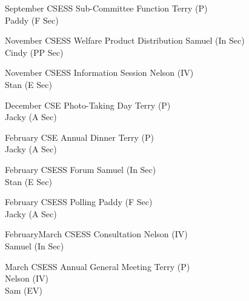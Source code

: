 {\bTR{}
\eTD\bTD September
\eTD{}
\eTD\bTD CSESS Sub-Committee Function
\eTD\bTD Terry (P) \\ Paddy (F Sec)
\eTD\eTR

\bTR{}
\eTD\bTD November
\eTD{}
\eTD\bTD CSESS Welfare Product Distribution
\eTD\bTD Samuel (In Sec) \\ Cindy (PP Sec)
\eTD\eTR

\bTR{}
\eTD\bTD November
\eTD{}
\eTD\bTD CSESS Information Session
\eTD\bTD Nelson (IV) \\ Stan (E Sec)
\eTD\eTR

\bTR{}
\eTD\bTD December
\eTD{}
\eTD\bTD CSE Photo-Taking Day
\eTD\bTD Terry (P) \\ Jacky (A Sec)
\eTD\eTR


\bTR{}
\eTD\bTD February
\eTD{}
\eTD\bTD CSE Annual Dinner
\eTD\bTD Terry (P) \\ Jacky (A Sec)
\eTD\eTR

\bTR{}
\eTD\bTD February
\eTD{}
\eTD\bTD CSESS Forum
\eTD\bTD Samuel (In Sec) \\ Stan (E Sec)
\eTD\eTR

\bTR{}
\eTD\bTD February
\eTD{}
\eTD\bTD CSESS Polling
\eTD\bTD Paddy (F Sec) \\ Jacky (A Sec)
\eTD\eTR

\bTR{}
\eTD\bTD February\endash March
\eTD{}
\eTD\bTD CSESS Consultation
\eTD\bTD Nelson (IV) \\ Samuel (In Sec)
\eTD\eTR

\bTR{}
\eTD\bTD March
\eTD{}
\eTD\bTD CSESS Annual General Meeting
\eTD\bTD Terry (P) \\ Nelson (IV) \\ Sam (EV)
\eTD\eTR

\eTABLEbody
\eTABLE
}

\pagebreak
